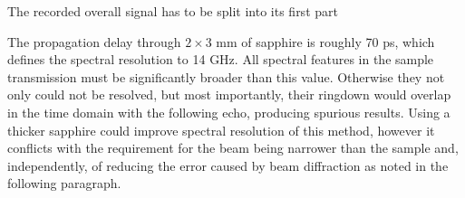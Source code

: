 The recorded overall signal has to be split into its first part  %


The propagation delay through $2\times 3$ mm of sapphire is roughly 70 ps, which defines the spectral resolution to 14 GHz. All spectral features in the sample transmission must be significantly broader than this value. Otherwise they not only could not be resolved, but most importantly, their ringdown would overlap in the time domain with the following echo, producing spurious results. Using a thicker sapphire could improve spectral resolution of this method, however it conflicts with the requirement for the beam being narrower than the sample \cite{nemec2009tunable} and, independently, of reducing the error caused by beam diffraction as noted in the following paragraph.

